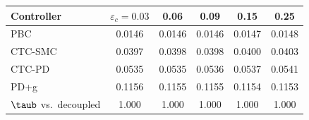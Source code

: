 \begin{tabular}{lccccc}
\toprule
Controller & $\varepsilon_{c} = 0.03$ & 0.06 & 0.09 & 0.15 & 0.25 \\
\midrule
PBC     & 0.0146 & 0.0146 & 0.0146 & 0.0147 & 0.0148 \\
CTC-SMC & 0.0397 & 0.0398 & 0.0398 & 0.0400 & 0.0403 \\
CTC-PD  & 0.0535 & 0.0535 & 0.0536 & 0.0537 & 0.0541 \\
PD+g    & 0.1156 & 0.1155 & 0.1155 & 0.1154 & 0.1153 \\
\midrule
$\taub$ vs.\ decoupled & 1.000 & 1.000 & 1.000 & 1.000 & 1.000 \\
\bottomrule
\end{tabular}
